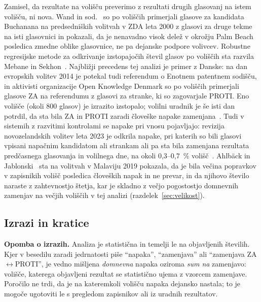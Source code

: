 \documentclass[11pt,a4paper]{article}
\begin{document}
Zamisel, da rezultate na volišču preverimo z rezultati drugih glasovanj na istem volišču, ni nova. Wand in sod.~\cite{wand2001} so po voliščih primerjali glasove za kandidata Buchanana na predsedniških volitvah v ZDA leta 2000 z glasovi za druge tekme na isti glasovnici in pokazali, da je nenavadno visok delež v okrožju Palm Beach posledica zmedne oblike glasovnice, ne pa dejanske podpore volivcev. Robustne regresijske metode za odkrivanje izstopajočih števil glasov po voliščih sta razvila Mebane in Sekhon~\cite{mebane2004}. Najbližji precedens tej analizi je primer z Danske: na dan evropskih volitev 2014 je potekal tudi referendum o Enotnem patentnem sodišču, in aktivisti organizacije Open Knowledge Denmark so po voliščih primerjali glasove ZA na referendumu z glasovi za stranke, ki so zagovarjale PROTI. Eno volišče (okoli 800 glasov) je izrazito izstopalo; volilni uradnik je še isti dan potrdil, da sta bila ZA in PROTI zaradi človeške napake zamenjana~\cite{okfn2014}. Tudi v sistemih z razvitimi kontrolami se napake pri vnosu pojavljajo: revizija novozelandskih volitev leta 2023 je odkrila napake, pri katerih so bili glasovi vpisani napačnim kandidatom ali strankam ali pa sta bila zamenjana rezultata predčasnega glasovanja in volilnega dne, na okoli 0,3--0,7~\% volišč~\cite{oagnz2024}. Ahlbäck in Jablonski~\cite{ahlback2025} sta na volitvah v Malaviju 2019 pokazala, da je bila večina popravkov v zapisnikih volišč posledica človeških napak in ne prevar, in da njihovo število naraste z zahtevnostjo štetja, kar je skladno z večjo pogostostjo domnevnih zamenjav na večjih voliščih v tej analizi (razdelek~\ref{sec:velikost}).


\subsection{Izrazi in kratice}
\label{sec:izrazi}

\textbf{Opomba o izrazih.} Analiza je statistična in temelji le na objavljenih številih. Kjer v besedilu zaradi jedrnatosti piše ``napaka'', ``zamenjava'' ali ``zamenjava ZA$\leftrightarrow$PROTI'', je vedno mišljena \emph{domnevna} napaka oziroma \emph{sum na} zamenjavo: volišče, katerega objavljeni rezultat se statistično ujema z vzorcem zamenjave. Poročilo ne trdi, da je na kateremkoli volišču napaka dejansko nastala; to je mogoče ugotoviti le s pregledom zapisnikov ali iz uradnih rezultatov.
\end{document}
